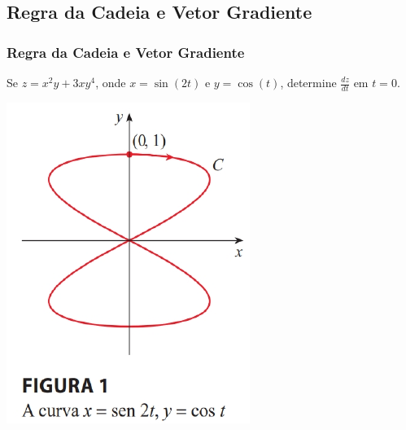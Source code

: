 \subsection*{Regra da Cadeia e Vetor Gradiente}


\begin{frame}[label=der-parciais]
	\frametitle{Regra da Cadeia e Vetor Gradiente }
		
\begin{minipage}{0.6\textwidth}
\begin{exe}
Se $z=x^2y+3xy^4$, onde $x=\sin(2t)$ e $y=\cos(t)$, determine $\frac{dz}{dt}$ em $t=0$.
\end{exe}
\end{minipage}
\begin{minipage}{0.3\textwidth}
\begin{center}
\includegraphics[scale=.4]{figuras/cadeia1.png}
\end{center}

\end{minipage}%
\end{frame}



